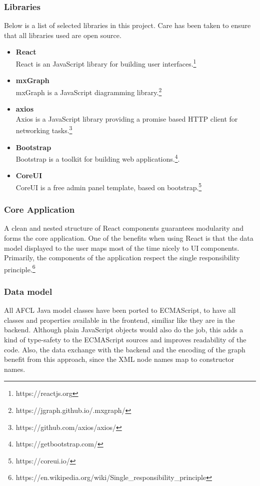 \documentclass[a4paper,12pt,pdftex,halfparskip,cleardoubleempty,bibtotoc,liststotoc]{scrbook}
\begin{document}
\subsubsection{Libraries}
Below is a list of selected libraries in this project. Care has been taken to ensure that all libraries used are open source.
\begin{itemize}
\item \textbf{React}\\
React is an JavaScript library for building user interfaces.\footnote{https://reactjs.org}
\item \textbf{mxGraph}\\
mxGraph is a JavaScript diagramming library.\footnote{https://jgraph.github.io/.mxgraph/}
\item \textbf{axios}\\
Axios is a JavaScript library providing a promise based HTTP client for networking tasks.\footnote{https://github.com/axios/axios/}
\item \textbf{Bootstrap}\\
Bootstrap is a toolkit for building web applications.\footnote{https://getbootstrap.com/}.
\item \textbf{CoreUI}\\
CoreUI is a free admin panel template, based on bootstrap.\footnote{https://coreui.io/}
\end{itemize}

\subsubsection{Core Application}

A clean and nested structure of React components guarantees modularity and forms the core application. One of the benefits when using React is that the data model displayed to the user maps most of the time nicely to UI components. Primarily, the components of the application respect the single responsibility principle.\footnote{https://en.wikipedia.org/wiki/Single\_responsibility\_principle}

\subsubsection{Data model}

All AFCL Java model classes have been ported to ECMAScript, to have all classes and properties available in the frontend, similiar like they are in the backend. Although plain JavaScript objects would also do the job, this adds a kind of type-safety to the ECMAScript sources and improves readability of the code. Also, the data exchange with the backend and the encoding of the graph benefit from this approach, since the XML node names map to constructor names.
\end{document}
